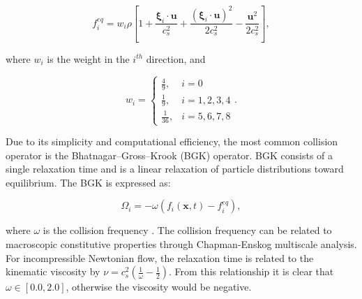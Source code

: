 \documentclass{article}
\newcommand{\pos}{\mathbf{x}}
\newcommand{\pvel}{\boldsymbol{\xi}}
\newcommand{\mvel}{\mathbf{u}}
\begin{document}
\begin{equation} \label{eq:feq}
f_i^{eq} = w_i \rho \left[1 + \frac{\pvel_i \cdot \mvel}{c_s^2} + \frac{(\pvel_i \cdot \mvel)^2}{2c_s^2} - \frac{\mvel^2}{2c_s^2} \right],
\end{equation}

\noindent where $w_i$ is the weight in the $i^{th}$ direction, and %

\begin{equation} \label{eq:weights}
w_i = \begin{cases}
    \frac{4}{9}, & i = 0 \\
    \frac{1}{9}, & i = 1, 2, 3, 4 \\
    \frac{1}{36}, & i = 5, 6, 7, 8
\end{cases}.
\end{equation}

Due to its simplicity and computational efficiency, the most common collision operator is the Bhatnagar--Gross--Krook (BGK) operator.
BGK consists of a single relaxation time and is a linear relaxation of particle distributions toward equilibrium.
The BGK is expressed as:

\begin{equation} \label{eq:bgk}
\Omega_i = -\omega (f_i(\pos, t) - f_i^{eq}),
\end{equation}

\noindent where $\omega$ is the collision frequency \cite{Bha54}.
The collision frequency can be related to macroscopic constitutive properties through Chapman-Enskog multiscale analysis.
For incompressible Newtonian flow, the relaxation time is related to the kinematic viscosity by $\nu = c_s^2(\frac{1}{\omega} - \frac{1}{2})$.
From this relationship it is clear that $\omega \in [0.0, 2.0]$, otherwise the viscosity would be negative.
\end{document}
